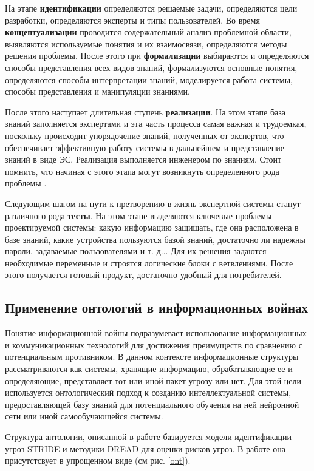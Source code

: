 На этапе \textbf{идентификации} определяются решаемые задачи, определяются цели разработки,
определяются эксперты и типы пользователей. Во время \textbf{концептуализации} проводится
содержательный анализ проблемной области, выявляются используемые понятия и их взаимосвязи,
определяются методы решения проблемы. После этого при \textbf{формализации}
выбираются и определяются способы представления всех видов знаний, формализуются основные
понятия, определяются способы интерпретации знаний, моделируется работа системы, способы
представления и манипуляции знаниями.

После этого наступает длительная ступень \textbf{реализации}. На этом этапе база знаний
заполняется экспертами и эта часть процесса самая важная и трудоемкая, поскольку происходит
упорядочение знаний, полученных от экспертов, что обеспечивает эффективную работу системы
в дальнейшем и представление знаний в виде ЭС. Реализация выполняется инженером по знаниям.
Стоит помнить, что начиная с этого этапа могут возникнуть определенного рода проблемы \cite{idea}.

Следующим шагом на пути к претворению в жизнь экспертной системы станут различного рода \textbf{тесты}.
На этом этапе выделяются ключевые проблемы проектируемой системы: какую информацию защищать, где она
расположена в базе знаний, какие устройства пользуются базой знаний, достаточно ли надежны пароли,
задаваемые пользователями и т. д... Для их решения задаются необходимые переменные и строятся логические
блоки с ветвлениями. После этого получается готовый продукт, достаточно удобный для потребителей.

\subsection{Применение онтологий в информационных войнах}
Понятие информационной войны подразумевает использование информационных и коммуникационных
технологий для достижения преимуществ по сравнению с потенциальным противником. В данном контексте
информационные структуры рассматриваются как системы, хранящие информацию, обрабатывающие ее и определяющие,
представляет тот или иной пакет угрозу или нет. Для этой цели используется онтологический подход к созданию
интеллектуальной системы, предоставляющей базу знаний для потенциального обучения на ней нейронной сети \cite{wars}
или иной самообучающейся системы.

Структура антологии, описанной в работе \cite{risk} базируется модели идентификации угроз STRIDE и методики DREAD
для оценки рисков угроз. В работе \cite{wars} она присутстсвует в упрощенном виде (см рис. \ref{ont}).

